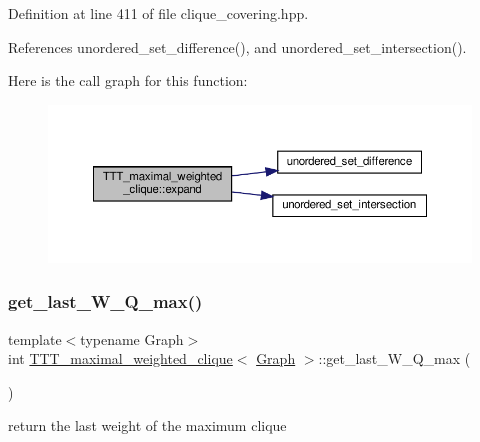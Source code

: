 Definition at line 411 of file clique\+\_\+covering.\+hpp.



References unordered\+\_\+set\+\_\+difference(), and unordered\+\_\+set\+\_\+intersection().

Here is the call graph for this function\+:
\nopagebreak
\begin{figure}[H]
\begin{center}
\leavevmode
\includegraphics[width=350pt]{df/d1e/classTTT__maximal__weighted__clique_a2fbe56bc02d8801552df3a0e161154be_cgraph}
\end{center}
\end{figure}
\mbox{\label{classTTT__maximal__weighted__clique_a3ac9a4a7d8f4fd5adfe0708ec06a68c3}} 
\subsubsection{\texorpdfstring{get\+\_\+last\+\_\+\+W\+\_\+\+Q\+\_\+max()}{get\_last\_W\_Q\_max()}}
{\footnotesize\ttfamily template$<$typename Graph$>$ \\
int \hyperlink{classTTT__maximal__weighted__clique}{T\+T\+T\+\_\+maximal\+\_\+weighted\+\_\+clique}$<$ \hyperlink{structGraph}{Graph} $>$\+::get\+\_\+last\+\_\+\+W\+\_\+\+Q\+\_\+max (\begin{DoxyParamCaption}{ }\end{DoxyParamCaption})\hspace{0.3cm}{\ttfamily [inline]}}



return the last weight of the maximum clique 




